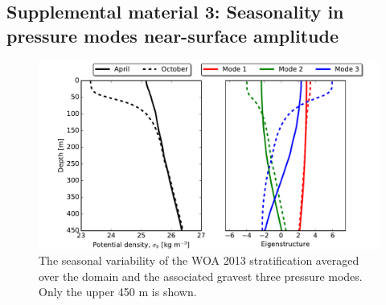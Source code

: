 \documentclass[grl]{agutex2015}
\begin{document}
\begin{article}
\section{Supplemental material 3: Seasonality in pressure modes near-surface amplitude}

\begin{figure}[ht]
   \begin{center}
     \includegraphics[width=1.\textwidth]{figs/fig_s3.pdf}
  \caption{The seasonal variability of the WOA 2013 stratification averaged  over
  the domain and the associated gravest three pressure modes. Only the upper 450 m is shown.}
  \label{figS3}
  \end{center}
\end{figure}


%
%
%
%
%
%



\end{article}
\end{document}
